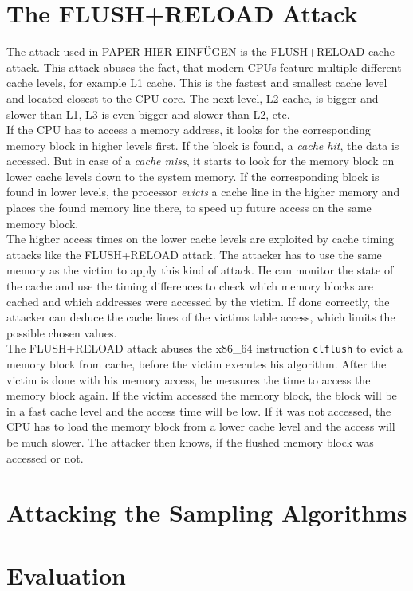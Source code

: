 \section{The FLUSH+RELOAD Attack}
The attack used in PAPER HIER EINFÜGEN is the FLUSH+RELOAD cache attack. This attack abuses the fact, that modern CPUs feature multiple different cache levels, for example L1 cache. This is the fastest and smallest cache level and located closest to the CPU core. The next level, L2 cache, is bigger and slower than L1, L3 is even bigger and slower than L2, etc.\\
If the CPU has to access a memory address, it looks for the corresponding memory block in higher levels first. If the block is found, a \textit{cache hit}, the data is accessed. But in case of a \textit{cache miss}, it starts to look for the memory block on lower cache levels down to the system memory. If the corresponding block is found in lower levels, the processor \textit{evicts} a cache line in the higher memory and places the found memory line there, to speed up future access on the same memory block.\\
The higher access times on the lower cache levels are exploited by cache timing attacks like the FLUSH+RELOAD attack. The attacker has to use the same memory as the victim to apply this kind of attack. He can monitor the state of the cache and use the timing differences to check which memory blocks are cached and which addresses were accessed by the victim. If done correctly, the attacker can deduce the cache lines of the victims table access, which limits the possible chosen values.\\
The FLUSH+RELOAD attack abuses the x86\_64 instruction \verb|clflush| to evict a memory block from cache, before the victim executes his algorithm. After the victim is done with his memory access, he measures the time to access the memory block again. If the victim accessed the memory block, the block will be in a fast cache level and the access time will be low. If it was not accessed, the CPU has to load the memory block from a lower cache level and the access will be much slower. The attacker then knows, if the flushed memory block was accessed or not.

\section{Attacking the Sampling Algorithms}
\section{Evaluation}
